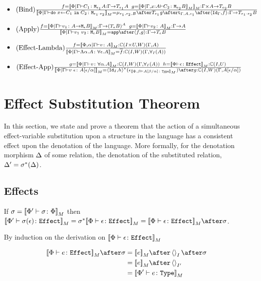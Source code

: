\documentclass{report}
\begin{document}
\begin{itemize}
    \item $\treerule{Bind}{f = \deno{\etyperelation{\P}{\G}{C_1}{\M{\e_1}{A}} : \G \rightarrow \T{\e_1}{A}\s\s g = \deno{\etyperelation{\P}{\gax}{C_2}{\M{\e_2}{B}}}}: \G \times A \rightarrow \T{\e_2}{B}}{\deno{\etyperelation{\P}{\G}{\doin{x}{C_1}{C_2}}{\M{\e_1 \dot \e_2}}} = \bind{\e_1}{\e_2}{B} \after \T{\e_1}{g} \after \tstrength{\G}{A}{\e_1} \after \pr{\idg}{f}: \G \rightarrow \T{\e_1 \dot \e_2}{B}}$ 
   
    \item $\treerule{Apply}{f = \deno{\gpetyperelation{v_1}{\lamtype{A}{\e}B}}: \G \rightarrow (\teb)^{A} \s\s g=\deno{\gpetyperelation{v_2}{A}}: \G \rightarrow A}{\deno{\gpetyperelation{\apply{v_1}{v_2}}{\meb}}= \app\after\pr{f}{g}: \G \rightarrow \teb }$
    \item $(\text{Effect-Lambda}) \frac{f = {\bf [\![}\Phi,\alpha\mid\Gamma \vdash v \colon A{\bf ]\!]}_M: \mathbb{C}(I\times U, W)(\Gamma, A)}{{\bf [\![}\Phi\mid\Gamma \vdash \Lambda \alpha. A \colon \forall \epsilon. A{\bf ]\!]}_M = \overline{f}: \mathbb{C}(I, W)(\Gamma, \forall_I(A))}$
    \item $\treerule{Effect-App}{g=\deno{\gpetyperelation{v}{\all{\a}{A}}}: \ciw(\G, \allI(A))\s\s h = \deno{\typerelation{\P}{\e}{\effect}}: \ciu}{\deno{\gpetyperelation{\eapp{v}{\e}}{A\ssub{\a}{\e}}} = \pr{\Id{I}}{h}\star(\e_{\deno{\typerelation{\P,\b}{A\ssub{\a}{\b}}{\type}}})\after g: \ciw(\G, A\ssub{\a}{\e})}$
\end{itemize}

\chapter{Effect Substitution Theorem}
In this section, we state and prove a theorem that the action of a simultaneous effect-variable substitution upon a structure in the language has a consistent effect upon the denotation of the language. More formally, for the denotation morphism $\Delta$ of some relation, the denotation of the substituted relation, $\Delta' = \sigma^*(\Delta)$.
\section{Effects}
If $\sigma = {\bf [\![}\Phi' \vdash \sigma \colon \Phi{\bf ]\!]}_M$ then $\deno{\typerelation{\P'}{\si(\e)}{\effect}} = \si\star\deno{\typerelation{\P}{\e}{\effect}} = \deno{\typerelation{\P}{\e}{\effect}}\after\si$.

\proof
By induction on the derivation on ${\bf [\![}\Phi \vdash \epsilon \colon \texttt{Effect}{\bf ]\!]}_M$

\begin{align}
    \deno{\typerelation{\P}{e}{\effect}}\after\si & = \deno{e}\after\term{I}\after\si \\
    & = \deno{e}\after\term{I'} \\
    & = \deno{\typerelation{\P'}{e}{\type}}\\
\end{align}
\end{document}
